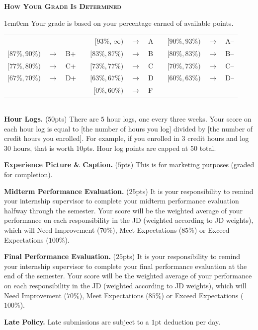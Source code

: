 \documentclass[11pt]{article}
\begin{document}
\textbf{\textsc{How Your Grade Is Determined}}
\begin{adjustwidth}{1cm}{0cm}
  Your grade is based on your percentage earned of available points.
  \begin{center}
    \begin{tabular}{rclcrclcrcl}
                      &               &     & & $[93\%,\,\infty)$ & $\rightarrow$ & A & & $[90\%, 93\%)$ & $\rightarrow$	& A--\\
      $[87\%, 90\%)$  & $\rightarrow$	& B+  & & $[83\%, 87\%)$  & $\rightarrow$ & B & & $[80\%, 83\%)$ & $\rightarrow$	& B--\\
      $[77\%, 80\%)$  & $\rightarrow$	& C+  & & $[73\%, 77\%)$  & $\rightarrow$ & C & & $[70\%, 73\%)$ & $\rightarrow$	& C--\\
      $[67\%, 70\%)$  & $\rightarrow$	& D+  & & $[63\%, 67\%)$  & $\rightarrow$ & D & & $[60\%, 63\%)$ & $\rightarrow$  & D--\\
                      &               &     & & $[ 0\%, 60\%)$  & $\rightarrow$ & F\\
    \end{tabular}
  \end{center}
  ~\\
  \textbf{Hour Logs.} ($50$pts) There are $5$ hour logs, one every three weeks. Your score on each hour log is equal to [the number of hours you log] divided by [the number of credit hours you enrolled]. For example, if you enrolled in $3$ credit hours and log $30$ hours, that is worth $10$pts. Hour log points are capped at $50$ total.

  \textbf{Experience Picture \& Caption.} ($5$pts) This is for marketing purposes (graded for completion).

  \textbf{Midterm Performance Evaluation.} ($25$pts) It is your responsibility to remind your internship supervisor to complete your midterm performance evaluation halfway through the semester. Your score will be the weighted average of your performance on each responsibility in the JD (weighted according to JD weights), which will Need Improvement ($70\%$), Meet Expectations ($85\%$) or Exceed Expectations ($100\%$).

  \textbf{Final Performance Evaluation.} ($25$pts) It is your responsibility to remind your internship supervisor to complete your final performance evaluation at the end of the semester. Your score will be the weighted average of your performance on each responsibility in the JD (weighted according to JD weights), which will Need Improvement ($70\%$), Meet Expectations ($85\%$) or Exceed Expectations ($100\%$).

  \textbf{Late Policy.} Late submissions are subject to a $1$pt deduction per day.
\end{adjustwidth}
\end{document}

